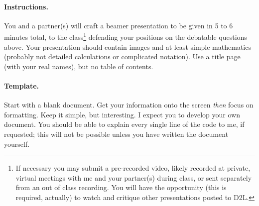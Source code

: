 \documentclass[11pt]{article}
\begin{document}
\paragraph{Instructions.}  You and a partner(s) will craft a beamer presentation to be given in 5 to 6 minutes total, to the class\footnote{If necessary you may submit a pre-recorded video, likely recorded at private, virtual meetings with me and your partner(s) during class, or sent separately from an out of class recording.  You will have the opportunity (this is required, actually) to watch and critique other presentations posted to D2L.} defending your positions on the debatable questions above.  Your presentation should contain images and at least simple mathematics (probably not detailed calculations or complicated notation).  Use a title page (with your real names), but no table of contents.  
\paragraph{Template.} Start with a blank document.  Get your information onto the screen \textit{then} focus on formatting.  Keep it simple, but interesting. I expect you to develop your own document.  You should be able to explain every single line of the code to me, if requested; this will not be possible unless you have written the document yourself.   
\end{document}
